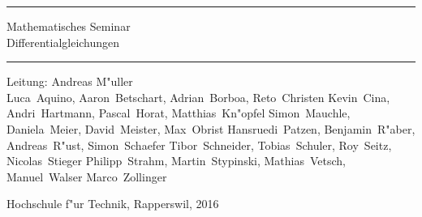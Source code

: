 \documentclass{book}
\begin{document}
\pagestyle{fancy}
\frontmatter
\newcommand\HRule{\noindent\rule{\linewidth}{1.5pt}}
\begin{titlepage}
\HRule
\vspace*{5pt}
\begin{flushright}
{
\LARGE
Mathematisches Seminar\\
\vspace*{20pt}
\Huge
Differentialgleichungen%
}
\vspace*{5pt}
\end{flushright}
\HRule
\begin{flushright}
\vspace{60pt}
\Large
Leitung: Andreas M"uller\\
\vspace{40pt}
\Large
Luca~Aquino,
Aaron~Betschart,
Adrian~Borboa,
Reto~Christen %
Kevin~Cina,
Andri~Hartmann,
Pascal~Horat,
Matthias~Kn"opfel %
Simon~Mauchle,
Daniela~Meier,
David~Meister,
Max~Obrist %
Hansruedi~Patzen,
Benjamin~R"aber,
Andreas~R"ust,
Simon~Schaefer %
Tibor~Schneider,
Tobias~Schuler,
Roy~Seitz,
Nicolas~Stieger %
Philipp~Strahm,
Martin~Stypinski,
Mathias~Vetsch,
Manuel~Walser %
Marco~Zollinger
\end{flushright}
\begin{center}
Hochschule f"ur Technik, Rapperswil, 2016
\end{center}
\end{titlepage}
\hypersetup{
    linktoc=all,
    linkcolor=blue
}
\newenvironment{beispiele}{
\bgroup\smallskip\parindent0pt\bf Beispiele\egroup

\begin{list}{\arabic{beispiel}.}
  {\usecounter{beispiel}
  \setlength{\labelsep}{5mm}
  \setlength{\rightmargin}{0pt}
}}{\end{list}}
\newenvironment{uebungsaufgaben}{
\begin{list}{\arabic{uebungsaufgabe}.}
  {\usecounter{uebungsaufgabe}
  \setlength{\labelwidth}{2cm}
  \setlength{\leftmargin}{0pt}
  \setlength{\labelsep}{5mm}
  \setlength{\rightmargin}{0pt}
  \setlength{\itemindent}{0pt}
}}{\end{list}\vfill\pagebreak}
\newenvironment{teilaufgaben}{
\begin{enumerate}
\renewcommand{\labelenumi}{\alph{enumi})}
}{\end{enumerate}}
\end{document}
